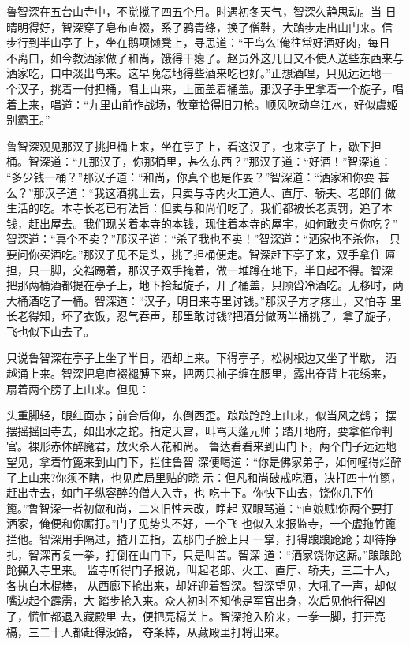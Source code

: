 鲁智深在五台山寺中，不觉搅了四五个月。时遇初冬天气，智深久静思动。当
日晴明得好，智深穿了皂布直裰，系了鸦青绦，换了僧鞋，大踏步走出山门来。信
步行到半山亭子上，坐在鹅项懒凳上，寻思道：“干鸟么!俺往常好酒好肉，每日
不离口，如今教洒家做了和尚，饿得干瘪了。赵员外这几日又不使人送些东西来与
洒家吃，口中淡出鸟来。这早晚怎地得些酒来吃也好。”正想酒哩，只见远远地一
个汉子，挑着一付担桶，唱上山来，上面盖着桶盖。那汉子手里拿着一个旋子，唱
着上来，唱道：“九里山前作战场，牧童拾得旧刀枪。顺风吹动乌江水，好似虞姬
别霸王。”

鲁智深观见那汉子挑担桶上来，坐在亭子上，看这汉子，也来亭子上，歇下担
桶。智深道：“兀那汉子，你那桶里，甚么东西？”那汉子道：“好酒！”智深道：
“多少钱一桶？”那汉子道：“和尚，你真个也是作耍？”智深道：“洒家和你耍
甚么？”那汉子道：“我这酒挑上去，只卖与寺内火工道人、直厅、轿夫、老郎们
做生活的吃。本寺长老已有法旨：但卖与和尚们吃了，我们都被长老责罚，追了本
钱，赶出屋去。我们现关着本寺的本钱，现住着本寺的屋宇，如何敢卖与你吃？”
智深道：“真个不卖？”那汉子道：“杀了我也不卖！”智深道：“洒家也不杀你，
只要问你买酒吃。”那汉子见不是头，挑了担桶便走。智深赶下亭子来，双手拿住
匾担，只一脚，交裆踢着，那汉子双手掩着，做一堆蹲在地下，半日起不得。智深
把那两桶酒都提在亭子上，地下拾起旋子，开了桶盖，只顾舀冷酒吃。无移时，两
大桶酒吃了一桶。智深道：“汉子，明日来寺里讨钱。”那汉子方才疼止，又怕寺
里长老得知，坏了衣饭，忍气吞声，那里敢讨钱?把酒分做两半桶挑了，拿了旋子，
飞也似下山去了。

只说鲁智深在亭子上坐了半日，酒却上来。下得亭子，松树根边又坐了半歇，
酒越涌上来。智深把皂直裰褪膊下来，把两只袖子缠在腰里，露出脊背上花绣来，
扇着两个膀子上山来。但见：

头重脚轻，眼红面赤；前合后仰，东倒西歪。踉踉跄跄上山来，似当风之鹤；
摆摆摇摇回寺去，如出水之蛇。指定天宫，叫骂天蓬元帅；踏开地府，要拿催命判
官。裸形赤体醉魔君，放火杀人花和尚。
鲁达看看来到山门下，两个门子远远地望见，拿着竹篦来到山门下，拦住鲁智
深便喝道：“你是佛家弟子，如何噇得烂醉了上山来?你须不瞎，也见库局里贴的晓
示：但凡和尚破戒吃酒，决打四十竹篦，赶出寺去，如门子纵容醉的僧人入寺，也
吃十下。你快下山去，饶你几下竹篦。”鲁智深一者初做和尚，二来旧性未改，睁起
双眼骂道：“直娘贼!你两个要打洒家，俺便和你厮打。”门子见势头不好，一个飞
也似入来报监寺，一个虚拖竹篦拦他。智深用手隔过，揸开五指，去那门子脸上只
一掌，打得踉踉跄跄；却待挣扎，智深再复一拳，打倒在山门下，只是叫苦。智深
道：“洒家饶你这厮。”踉踉跄跄攧入寺里来。
监寺听得门子报说，叫起老郎、火工、直厅、轿夫，三二十人，各执白木棍棒，
从西廊下抢出来，却好迎着智深。智深望见，大吼了一声，却似嘴边起个霹雳，大
踏步抢入来。众人初时不知他是军官出身，次后见他行得凶了，慌忙都退入藏殿里
去，便把亮槅关上。智深抢入阶来，一拳一脚，打开亮槅，三二十人都赶得没路，
夺条棒，从藏殿里打将出来。

